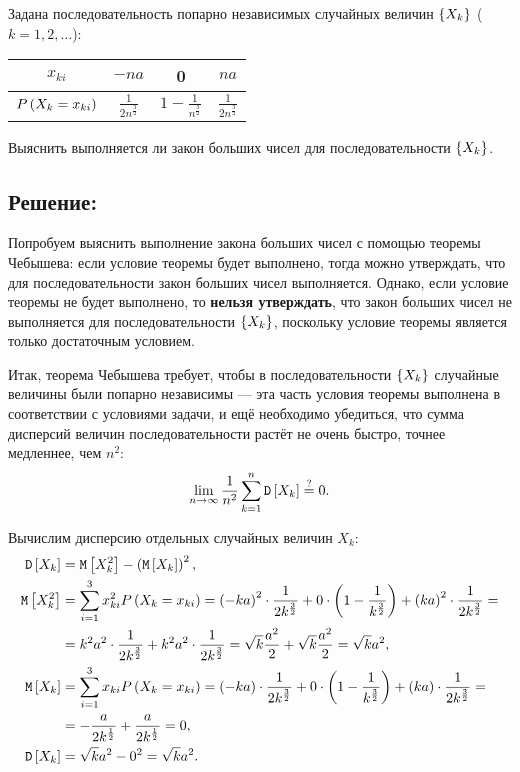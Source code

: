 Задана последовательность попарно независимых случайных величин $\left \{ X_k \right \}$ ($k=1,2,\dots$):

\begin{tabular}{|c|c|c|c|}
    \hline
    $x_{ki}$                     & $-n a$                        & 0                             & $na$                       \\
    \hline
    $P \left ( X_k = x_{ki} \right )$ & $\frac{1}{2 n^{\frac{3}{2}}}$ & $1 - \frac{1}{n^\frac{3}{2}}$ & $\frac{1}{2n^\frac{3}{2}}$ \\
    \hline
\end{tabular}

Выяснить выполняется ли закон больших чисел для последовательности $\left \{ X_k \right \}$.

\subsection*{Решение:}
Попробуем выяснить выполнение закона больших чисел с помощью теоремы Чебышева: если условие теоремы будет выполнено,
тогда можно утверждать, что для последовательности закон больших чисел выполняется. Однако, если условие теоремы не будет выполнено, то
\textbf{нельзя утверждать}, что закон больших чисел не выполняется для последовательности $\left \{ X_k \right \}$, поскольку условие теоремы является только достаточным условием.

Итак, теорема Чебышева требует, чтобы в последовательности $\left \{ X_k \right \}$ случайные величины были попарно независимы --- эта часть условия
теоремы выполнена в соответствии с условиями задачи, и ещё необходимо убедиться, что сумма дисперсий величин последовательности растёт не очень быстро,
точнее медленнее, чем $n^2$:
\begin{equation}
    \lim_{n \rightarrow \infty} \frac{1}{n^2} \sum_{k=1}^n \mathtt{D} \left [ X_k \right ] \stackrel{?}{=} 0 .
\end{equation}

Вычислим дисперсию отдельных случайных величин $X_k$:
\begin{align}
    \mathtt{D} \left [ X_k \right ] & = \mathtt{M} \left [ X_k^2 \right ] - \left ( \mathtt{M} \left [ X_k \right ] \right )^2 , \\
    \mathtt{M} \left [ X_k^2 \right ]
    & = \sum_{i=1}^3 x_{ki}^2 P \left ( X_k = x_{ki} \right )
    = \left ( - k a \right )^2 \cdot \frac{1}{2 k^\frac{3}{2}} + 0 \cdot \left ( 1 - \frac{1}{k^\frac{3}{2}} \right ) + \left ( k a \right )^2 \cdot \frac{1}{2 k^\frac{3}{2}} = \notag \\
    & = k^2 a^2 \cdot \frac{1}{2 k^\frac{3}{2}} + k^2 a^2 \cdot \frac{1}{2 k^\frac{3}{2}}
    = \sqrt{k} \frac{a^2}{2} + \sqrt{k} \frac{a^2}{2} = \sqrt{k} a^2 , \\
    \mathtt{M} \left [ X_k \right ]
    & = \sum_{i=1}^3 x_{ki} P \left ( X_k = x_{ki} \right )
    = \left ( - k a \right ) \cdot \frac{1}{2 k^\frac{3}{2}} + 0 \cdot \left ( 1 - \frac{1}{k^\frac{3}{2}} \right ) + \left ( k a \right ) \cdot \frac{1}{2 k^\frac{3}{2}} = \notag \\
    & = - \frac{a}{2 k^\frac{1}{2}} + \frac{a}{2 k^\frac{1}{2}} = 0,\\
    \mathtt{D} \left [ X_k \right ] & = \sqrt{k} a^2 - 0^2 = \sqrt{k} a^2 .
\end{align}


